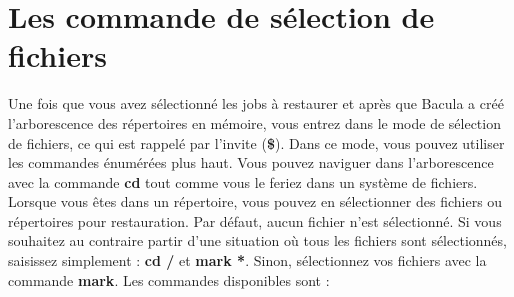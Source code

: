 \section{Les commande de s\'election de fichiers}

Une fois que vous avez s\'electionn\'e les jobs \`a restaurer et apr\`es que Bacula a cr\'e\'e 
l'arborescence des r\'epertoires en m\'emoire, vous entrez dans le mode de s\'election 
de fichiers, ce qui est rappel\'e par l'invite ({\bf \$}). Dans ce mode, vous 
pouvez utiliser les commandes \'enum\'er\'ees plus haut. Vous pouvez naviguer dans 
l'arborescence avec la commande {\bf cd} tout comme vous le feriez dans  
un syst\`eme de fichiers. Lorsque vous \^etes dans un r\'epertoire, vous pouvez en 
s\'electionner des fichiers ou r\'epertoires pour restauration. Par d\'efaut, aucun 
fichier n'est s\'electionn\'e. Si vous souhaitez au contraire partir d'une situation 
o\`u tous les fichiers sont s\'electionn\'es, saisissez simplement : {\bf cd /} et 
{\bf mark *}. Sinon, s\'electionnez vos fichiers avec la commande {\bf mark}. Les 
commandes disponibles sont :


